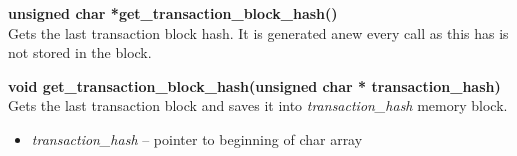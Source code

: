 \documentclass{article}
\begin{document}
\textbf{unsigned char *get\_transaction\_block\_hash()} \\
Gets the last transaction block hash. It is generated anew every call as this has is not stored in the block. \\ \par

\textbf{void get\_transaction\_block\_hash(unsigned char * transaction\_hash)} \\
Gets the last transaction block and saves it into \textit{transaction\_hash} memory block.
\begin{itemize}
    \item \textit{transaction\_hash} -- pointer to beginning of char array
\end{itemize}
\end{document}
